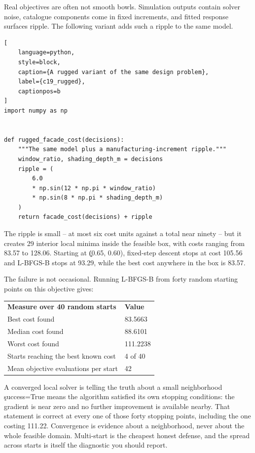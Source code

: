 Real objectives are often not smooth bowls. Simulation outputs contain solver
noise, catalogue components come in fixed increments, and fitted response
surfaces ripple. The following variant adds such a ripple to the same model.

\begin{lstlisting}[
    language=python,
    style=block,
    caption={A rugged variant of the same design problem},
    label={c19_rugged},
    captionpos=b
]
import numpy as np


def rugged_facade_cost(decisions):
    """The same model plus a manufacturing-increment ripple."""
    window_ratio, shading_depth_m = decisions
    ripple = (
        6.0
        * np.sin(12 * np.pi * window_ratio)
        * np.sin(8 * np.pi * shading_depth_m)
    )
    return facade_cost(decisions) + ripple
\end{lstlisting}

The ripple is small -- at most six cost units against a total near ninety -- but
it creates 29 interior local minima inside the feasible box, with costs ranging
from 83.57 to 128.06. Starting at \c{(0.65, 0.60)}, fixed-step descent stops at
cost 105.56 and L-BFGS-B stops at 93.29, while the best cost anywhere in the box
is 83.57.

The failure is not occasional. Running L-BFGS-B from forty random starting
points on this objective gives:

\begin{center}
\begin{tabular}{ll}
\textbf{Measure over 40 random starts} & \textbf{Value} \\
Best cost found & 83.5663 \\
Median cost found & 88.6101 \\
Worst cost found & 111.2238 \\
Starts reaching the best known cost & 4 of 40 \\
Mean objective evaluations per start & 42 \\
\end{tabular}
\end{center}

\begin{ExplainBox}{A converged local solver is telling the truth about a small neighborhood}
\c{success=True} means the algorithm satisfied its own stopping conditions: the
gradient is near zero and no further improvement is available nearby. That
statement is correct at every one of those forty stopping points, including the
one costing 111.22. Convergence is evidence about a neighborhood, never about
the whole feasible domain. Multi-start is the cheapest honest defense, and the
spread across starts is itself the diagnostic you should report.
\end{ExplainBox}

